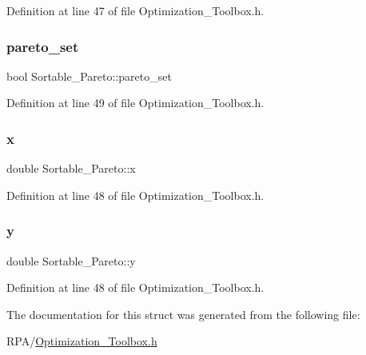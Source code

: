 Definition at line 47 of file Optimization\+\_\+\+Toolbox.\+h.

\mbox{\label{struct_sortable___pareto_a0e2e26ce019397c46470e63af05fc5c7}} 
\subsubsection{\texorpdfstring{pareto\+\_\+set}{pareto\_set}}
{\footnotesize\ttfamily bool Sortable\+\_\+\+Pareto\+::pareto\+\_\+set}



Definition at line 49 of file Optimization\+\_\+\+Toolbox.\+h.

\mbox{\label{struct_sortable___pareto_ae5c3b332c8a192961de0a085d59432da}} 
\subsubsection{\texorpdfstring{x}{x}}
{\footnotesize\ttfamily double Sortable\+\_\+\+Pareto\+::x}



Definition at line 48 of file Optimization\+\_\+\+Toolbox.\+h.

\mbox{\label{struct_sortable___pareto_a00f29310c191ed10f9a6b58977be1bd7}} 
\subsubsection{\texorpdfstring{y}{y}}
{\footnotesize\ttfamily double Sortable\+\_\+\+Pareto\+::y}



Definition at line 48 of file Optimization\+\_\+\+Toolbox.\+h.



The documentation for this struct was generated from the following file\+:\begin{DoxyCompactItemize}
\item 
R\+P\+A/\mbox{\hyperlink{_optimization___toolbox_8h}{Optimization\+\_\+\+Toolbox.\+h}}\end{DoxyCompactItemize}

